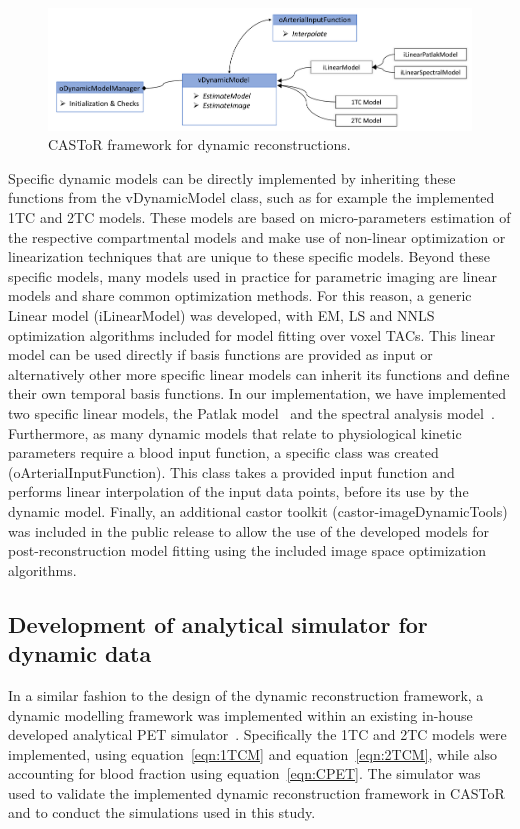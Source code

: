 \begin{figure} [htp!]
\centering
\includegraphics[scale=0.48,angle=0]{3_Results/3_2_Dynamic_Reconstruction_SimulationStudy/figures/oDynamicModelManager.pdf}
\caption{CASToR framework for dynamic reconstructions.} 
\label{fig3_2:DynamicModelManager}
\end{figure}

Specific dynamic models can be directly implemented by inheriting these functions from the vDynamicModel class, such as for example the implemented 1TC and 2TC models. These models are based on micro-parameters estimation of the respective compartmental models and make use of non-linear optimization or linearization techniques that are unique to these specific models. 
Beyond these specific models, many models used in practice for parametric imaging are linear models and share common optimization methods. For this reason, a generic Linear model (iLinearModel) was developed, with EM, LS and NNLS optimization algorithms included for model fitting over voxel TACs. This linear model can be used directly if basis functions are provided as input or alternatively other more specific linear models can inherit its functions and define their own temporal basis functions.
In our implementation, we have implemented two specific linear models, the Patlak model~\cite{Patlak1985} and the spectral analysis model~\cite{Cunningham1993}. 
Furthermore, as many dynamic models that relate to physiological kinetic parameters require a blood input function, a specific class was created (oArterialInputFunction). This class takes a provided input function and performs linear interpolation of the input data points, before its use by the dynamic model. 
Finally, an additional castor toolkit (castor-imageDynamicTools) was included in the public release to allow the use of the developed models for post-reconstruction model fitting using the included image space optimization algorithms. 

\subsection{Development of analytical simulator for dynamic data}
In a similar fashion to the design of the dynamic reconstruction framework, a dynamic modelling framework was implemented within an existing in-house developed analytical PET simulator~\cite{Stute2015}. Specifically the 1TC and 2TC models were implemented, using equation~\ref{eqn:1TCM} and equation~\ref{eqn:2TCM}, while also accounting for blood fraction using equation~\ref{eqn:CPET}.
The simulator was used to validate the implemented dynamic reconstruction framework in CASToR and to conduct the simulations used in this study.

